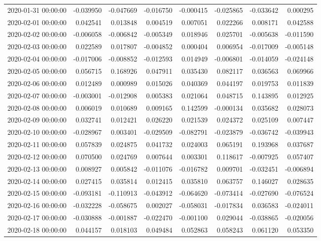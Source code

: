 \begin{tabular}{lrrrrrrr}
2020-01-31 00:00:00 & -0.039950 & -0.047669 & -0.016750 & -0.000415 & -0.025865 & -0.033642 & 0.000295 \\
2020-02-01 00:00:00 & 0.042541 & 0.013848 & 0.004519 & 0.007051 & 0.022266 & 0.008171 & 0.042588 \\
2020-02-02 00:00:00 & -0.006058 & -0.006842 & -0.005349 & 0.018946 & 0.025701 & -0.005638 & -0.011590 \\
2020-02-03 00:00:00 & 0.022589 & 0.017807 & -0.004852 & 0.000404 & 0.006954 & -0.017009 & -0.005148 \\
2020-02-04 00:00:00 & -0.017006 & -0.008852 & -0.012593 & 0.014949 & -0.006801 & -0.014059 & -0.024148 \\
2020-02-05 00:00:00 & 0.056715 & 0.168926 & 0.047911 & 0.035430 & 0.082117 & 0.036563 & 0.069966 \\
2020-02-06 00:00:00 & 0.012489 & 0.000989 & 0.015026 & 0.040369 & 0.044197 & 0.019753 & 0.011839 \\
2020-02-07 00:00:00 & -0.003001 & -0.012908 & 0.005383 & 0.021064 & 0.048715 & 0.143895 & 0.012925 \\
2020-02-08 00:00:00 & 0.006019 & 0.010689 & 0.009165 & 0.142599 & -0.000134 & 0.035682 & 0.028073 \\
2020-02-09 00:00:00 & 0.032741 & 0.012421 & 0.026220 & 0.021539 & 0.024372 & 0.025109 & 0.007447 \\
2020-02-10 00:00:00 & -0.028967 & 0.003401 & -0.029509 & -0.082791 & -0.023879 & -0.036742 & -0.039943 \\
2020-02-11 00:00:00 & 0.057839 & 0.024875 & 0.041732 & 0.024003 & 0.065191 & 0.193968 & 0.037687 \\
2020-02-12 00:00:00 & 0.070500 & 0.024769 & 0.007644 & 0.003301 & 0.118617 & -0.007925 & 0.057407 \\
2020-02-13 00:00:00 & 0.008927 & 0.005842 & -0.011076 & -0.016782 & 0.009701 & -0.032451 & -0.006894 \\
2020-02-14 00:00:00 & 0.027415 & 0.035814 & 0.012415 & 0.035810 & 0.063757 & 0.146027 & 0.028635 \\
2020-02-15 00:00:00 & -0.093181 & -0.110913 & -0.043912 & -0.064620 & -0.073414 & -0.027690 & -0.076524 \\
2020-02-16 00:00:00 & -0.032228 & -0.058675 & 0.002027 & -0.058031 & -0.017834 & 0.036583 & -0.024011 \\
2020-02-17 00:00:00 & -0.030888 & -0.001887 & -0.022470 & -0.001100 & 0.029044 & -0.038865 & -0.020056 \\
2020-02-18 00:00:00 & 0.044157 & 0.018103 & 0.049484 & 0.052863 & 0.058243 & 0.061120 & 0.053350 \\

\end{tabular}
